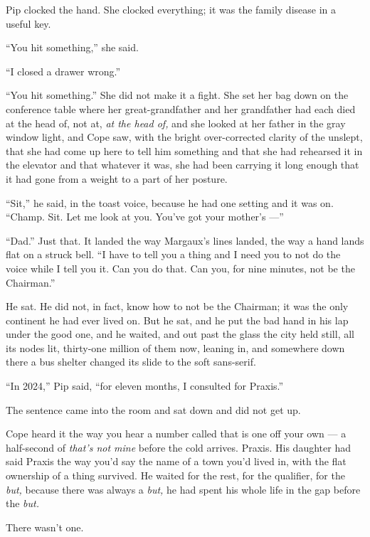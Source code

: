 \documentclass[11pt,openany]{book}
\newcommand{\scenebreak}{\par\vspace{0.5\baselineskip}\begin{center}\textasteriskcentered\quad\textasteriskcentered\quad\textasteriskcentered\end{center}\vspace{0.5\baselineskip}\par}
\begin{document}
Pip clocked the hand. She clocked everything; it was the family disease in a useful key.

``You hit something,'' she said.

``I closed a drawer wrong.''

``You hit something.'' She did not make it a fight. She set her bag down on the conference table where her great-grandfather and her grandfather had each died at the head of, not at, \textit{at the head of,} and she looked at her father in the gray window light, and Cope saw, with the bright over-corrected clarity of the unslept, that she had come up here to tell him something and that she had rehearsed it in the elevator and that whatever it was, she had been carrying it long enough that it had gone from a weight to a part of her posture.

``Sit,'' he said, in the toast voice, because he had one setting and it was on. ``Champ. Sit. Let me look at you. You've got your mother's ---''

``Dad.'' Just that. It landed the way Margaux's lines landed, the way a hand lands flat on a struck bell. ``I have to tell you a thing and I need you to not do the voice while I tell you it. Can you do that. Can you, for nine minutes, not be the Chairman.''

He sat. He did not, in fact, know how to not be the Chairman; it was the only continent he had ever lived on. But he sat, and he put the bad hand in his lap under the good one, and he waited, and out past the glass the city held still, all its nodes lit, thirty-one million of them now, leaning in, and somewhere down there a bus shelter changed its slide to the soft sans-serif.


\scenebreak


``In 2024,'' Pip said, ``for eleven months, I consulted for Praxis.''

The sentence came into the room and sat down and did not get up.

Cope heard it the way you hear a number called that is one off your own --- a half-second of \textit{that's not mine} before the cold arrives. Praxis. His daughter had said Praxis the way you'd say the name of a town you'd lived in, with the flat ownership of a thing survived. He waited for the rest, for the qualifier, for the \textit{but,} because there was always a \textit{but,} he had spent his whole life in the gap before the \textit{but.}

There wasn't one.
\end{document}
